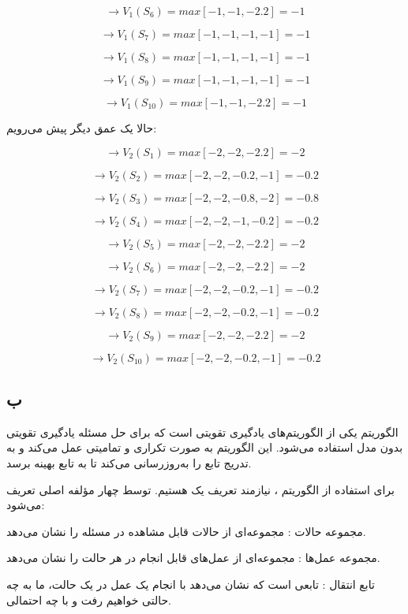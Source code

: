 $$
\rightarrow V_1(S_6) = max[-1 , -1 , -2.2] = -1
$$

$$
\rightarrow V_1(S_7) = max[-1 , -1 , -1 , -1] = -1
$$

$$
\rightarrow V_1(S_8) = max[-1 , -1 , -1 , -1] = -1
$$

$$
\rightarrow V_1(S_9) = max[-1 , -1 , -1 , -1] = -1
$$

$$
\rightarrow V_1(S_{10}) = max[-1 , -1 , -2.2] = -1
$$

حالا یک عمق دیگر پیش می‌رویم:

$$
\rightarrow V_2(S_1) = max[-2 , -2 , -2.2] = -2
$$

$$
\rightarrow V_2(S_2) = max[-2 , -2 , -0.2, -1] = -0.2
$$

$$
\rightarrow V_2(S_3) = max[-2 , -2 , -0.8, -2] = -0.8
$$

$$
\rightarrow V_2(S_4) = max[-2 , -2 , -1, -0.2] = -0.2
$$

$$
\rightarrow V_2(S_5) = max[-2 , -2 , -2.2] = -2
$$

$$
\rightarrow V_2(S_6) = max[-2 , -2 , -2.2] = -2
$$

$$
\rightarrow V_2(S_7) = max[-2 , -2 , -0.2, -1] = -0.2
$$

$$
\rightarrow V_2(S_8) = max[-2 , -2 , -0.2, -1] = -0.2
$$

$$
\rightarrow V_2(S_9) = max[-2 , -2 , -2.2] = -2
$$

$$
\rightarrow V_2(S_{10}) = max[-2 , -2 , -0.2, -1] = -0.2
$$

\subsection*{ب}

الگوریتم
یکی از الگوریتم‌های یادگیری تقویتی است که برای حل مسئله یادگیری تقویتی بدون مدل
استفاده می‌شود. این الگوریتم به صورت تکراری و تمامیتی عمل می‌کند و به تدریج تابع 
را به‌روزرسانی می‌کند تا به تابع
بهینه برسد.

برای استفاده از الگوریتم
، نیازمند تعریف یک
هستیم.
توسط چهار مؤلفه اصلی تعریف می‌شود:

مجموعه حالات
:
مجموعه‌ای از حالات قابل مشاهده در مسئله را نشان می‌دهد.

مجموعه عمل‌ها 
:
مجموعه‌ای از عمل‌های قابل انجام در هر حالت را نشان می‌دهد.

تابع انتقال 
:
تابعی است که نشان می‌دهد با انجام یک عمل در یک حالت، ما به چه حالتی خواهیم رفت و با چه احتمالی.

